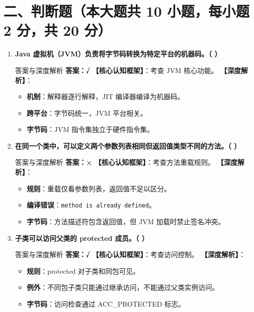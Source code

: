 \documentclass[12pt, a4paper]{ctexart}
\newcommand{\code}[1]{\texttt{\color{myblue}#1}}
\begin{document}
\section*{二、判断题（本大题共 10 小题，每小题 2 分，共 20 分）}

\begin{enumerate}[label=\arabic*.]
\item \textbf{Java 虚拟机（JVM）负责将字节码转换为特定平台的机器码。（ \quad ）}
\begin{bluebox}{答案与深度解析}
\textbf{答案：√}
\textbf{【核心认知框架】}：考查 JVM 核心功能。
\textbf{【深度解析】}：
\begin{itemize}[leftmargin=*, nosep]
    \item \textbf{机制}：解释器逐行解释，JIT 编译器编译为机器码。
    \item \textbf{跨平台}：字节码统一，JVM 平台相关。
    \item \textbf{字节码}：JVM 指令集独立于硬件指令集。
\end{itemize}
\end{bluebox}

\item \textbf{在同一个类中，可以定义两个参数列表相同但返回值类型不同的方法。（ \quad ）}
\begin{bluebox}{答案与深度解析}
\textbf{答案：×}
\textbf{【核心认知框架】}：考查方法重载规则。
\textbf{【深度解析】}：
\begin{itemize}[leftmargin=*, nosep]
    \item \textbf{规则}：重载仅看参数列表，返回值不足以区分。
    \item \textbf{编译错误}：\code{method is already defined}。
    \item \textbf{字节码}：方法描述符包含返回值，但 JVM 加载时禁止签名冲突。
\end{itemize}
\end{bluebox}

\item \textbf{子类可以访问父类的 protected 成员。（ \quad ）}
\begin{bluebox}{答案与深度解析}
\textbf{答案：√}
\textbf{【核心认知框架】}：考查访问控制。
\textbf{【深度解析】}：
\begin{itemize}[leftmargin=*, nosep]
    \item \textbf{规则}：protected 对子类和同包可见。
    \item \textbf{例外}：不同包子类只能通过继承访问，不能通过父类实例访问。
    \item \textbf{字节码}：访问检查通过 ACC\_PROTECTED 标志。
\end{itemize}
\end{bluebox}


\end{enumerate}
\end{document}
